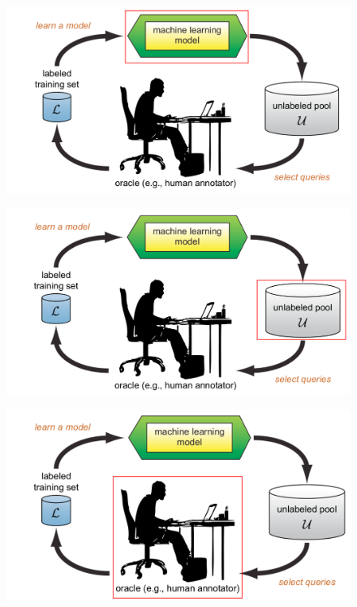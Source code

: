 \documentclass[10pt]{beamer}
\begin{document}
\begin{frame}[fragile]
    \begin{figure}[htp]
        \centering
        \includegraphics[scale=0.3]{images/active_learning_ml_model.png}
    \end{figure}
\end{frame}

\begin{frame}[fragile]
    \begin{figure}[htp]
        \centering
        \includegraphics[scale=0.3]{images/active_learning_unlabeled.png}
    \end{figure}
\end{frame}

\begin{frame}[fragile]
    \begin{figure}[htp]
        \centering
        \includegraphics[scale=0.3]{images/active_learning_oracle.png}
    \end{figure}
\end{frame}
\end{document}
